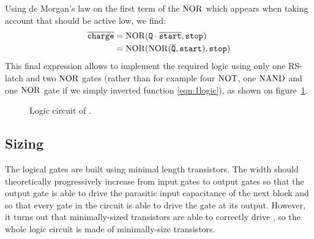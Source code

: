 Using de Morgan's law on the first term of the $\operatorname{NOR}$ which appears when taking account that  should be active low, we find:
\begin{align*}
\overline{\mathtt{charge}} &= \operatorname{NOR}(\mathtt{Q}\cdot\overline{\mathtt{start}}, \mathtt{stop})\\
&=\operatorname{NOR}(\operatorname{NOR}(\overline{\mathtt{Q}}, \mathtt{start}), \mathtt{stop})
\end{align*}
This final expression allows to implement the required logic using only one RS-latch and two $\operatorname{NOR}$ gates (rather than for example four $\operatorname{NOT}$, one $\operatorname{NAND}$ and one $\operatorname{NOR}$ gate if we simply inverted function \ref{eqn:1logic}), as shown on figure~\ref{fig:blklogic}.
\begin{figure}
  \centering
  \caption{Logic circuit of .\label{fig:blklogic}}
\end{figure}

\subsection{Sizing}
The logical gates are built using minimal length transistors. The width should theoretically progressively increase from input gates to output gates so that the output gate is able to drive the parasitic input capacitance of the next block and so that every gate in the circuit is able to drive the gate at its output. However, it turns out that minimally-sized transistors are able to correctly drive , so the whole logic circuit is made of minimally-size transistors.
